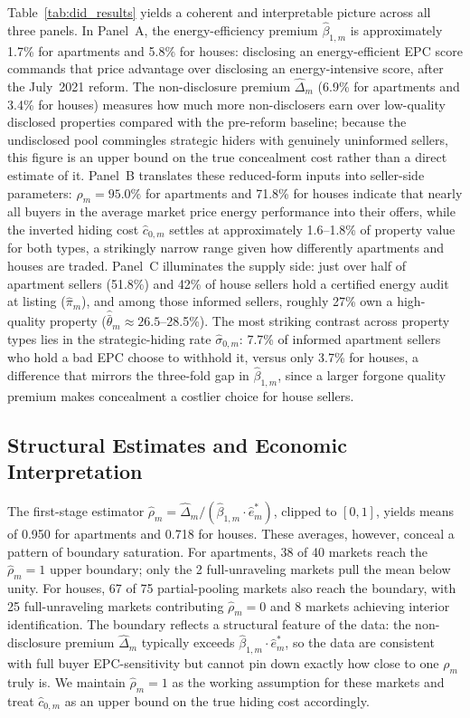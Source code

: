 \documentclass[10pt,letterpaper]{bp-template-concise}
\begin{document}
Table~\ref{tab:did_results} yields a coherent and interpretable picture across all three panels.
In Panel~A, the energy-efficiency premium $\hat\beta_{1,m}$ is approximately 1.7\% for
apartments and 5.8\% for houses: disclosing an energy-efficient EPC score commands that price advantage
over disclosing an energy-intensive score, after the July~2021 reform. The non-disclosure premium
$\hat\Delta_m$ (6.9\% for apartments and 3.4\% for houses) measures how much more
non-disclosers earn over low-quality disclosed properties compared with the pre-reform
baseline; because the undisclosed pool commingles strategic hiders with genuinely uninformed
sellers, this figure is an upper bound on the true concealment cost rather than a direct
estimate of it. Panel~B translates these reduced-form inputs into seller-side parameters: $\hat\rho_m = 95.0\%$ for apartments and 71.8\% for
houses indicate that nearly all buyers in the average market price energy performance into
their offers, while the inverted hiding cost $\hat{c}_{0,m}$ settles at approximately
1.6--1.8\% of property value for both types, a strikingly narrow range given how differently
apartments and houses are traded. Panel~C
illuminates the supply side: just over half of apartment sellers (51.8\%) and 42\% of house
sellers hold a certified energy audit at listing ($\hat\pi_m$), and among those informed
sellers, roughly 27\% own a high-quality property ($\hat{\bar\theta}_m \approx 26.5$--28.5\%).
The most striking contrast across property types lies in the strategic-hiding rate
$\hat\sigma_{0,m}$: 7.7\% of informed apartment sellers who hold a bad EPC choose to withhold
it, versus only 3.7\% for houses, a difference that mirrors the three-fold gap in
$\hat\beta_{1,m}$, since a larger forgone quality premium makes concealment a costlier choice
for house sellers.

\subsection{Structural Estimates and Economic Interpretation}

The first-stage estimator $\hat\rho_m = \hat\Delta_m / (\hat\beta_{1,m} \cdot \hat{e}^*_m)$, clipped to $[0,1]$, yields means of 0.950 for apartments and 0.718 for houses. These averages, however, conceal a pattern of boundary saturation. For apartments, 38 of 40 markets reach the $\hat\rho_m = 1$ upper boundary; only the 2 full-unraveling markets pull the mean below unity. For houses, 67 of 75 partial-pooling markets also reach the boundary, with 25 full-unraveling markets contributing $\hat\rho_m = 0$ and 8 markets achieving interior identification. The boundary reflects a structural feature of the data: the non-disclosure premium $\hat\Delta_m$ typically exceeds $\hat\beta_{1,m} \cdot \hat{e}^*_m$, so the data are consistent with full buyer EPC-sensitivity but cannot pin down exactly how close to one $\rho_m$ truly is. We maintain $\hat\rho_m = 1$ as the working assumption for these markets and treat $\hat{c}_{0,m}$ as an upper bound on the true hiding cost accordingly.
\end{document}
